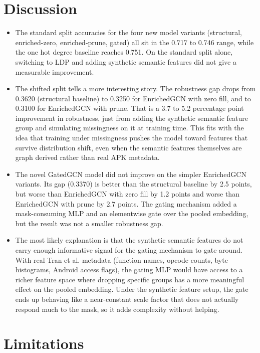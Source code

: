 \documentclass[12pt]{article}
\begin{document}
\section{Discussion}

\begin{itemize}
    \item The standard split accuracies for the four new model variants (structural, enriched-zero, enriched-prune, gated) all sit in the 0.717 to 0.746 range, while the one hot degree baseline reaches 0.751. On the standard split alone, switching to LDP and adding synthetic semantic features did not give a measurable improvement.
    \item The shifted split tells a more interesting story. The robustness gap drops from 0.3620 (structural baseline) to 0.3250 for EnrichedGCN with zero fill, and to 0.3100 for EnrichedGCN with prune. That is a 3.7 to 5.2 percentage point improvement in robustness, just from adding the synthetic semantic feature group and simulating missingness on it at training time. This fits with the idea that training under missingness pushes the model toward features that survive distribution shift, even when the semantic features themselves are graph derived rather than real APK metadata.
    \item The novel GatedGCN model did not improve on the simpler EnrichedGCN variants. Its gap (0.3370) is better than the structural baseline by 2.5 points, but worse than EnrichedGCN with zero fill by 1.2 points and worse than EnrichedGCN with prune by 2.7 points. The gating mechanism added a mask-consuming MLP and an elementwise gate over the pooled embedding, but the result was not a smaller robustness gap.
    \item The most likely explanation is that the synthetic semantic features do not carry enough informative signal for the gating mechanism to gate around. With real Tran et al. metadata (function names, opcode counts, byte histograms, Android access flags), the gating MLP would have access to a richer feature space where dropping specific groups has a more meaningful effect on the pooled embedding. Under the synthetic feature setup, the gate ends up behaving like a near-constant scale factor that does not actually respond much to the mask, so it adds complexity without helping.
\end{itemize}

\section{Limitations}
\end{document}
